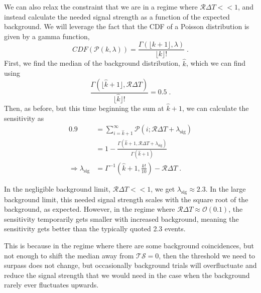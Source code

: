 \documentclass[a4paper,11pt]{article}
\newcommand\ts{\mathcal{TS}}
\begin{document}
We can also relax the constraint that we are in a regime where $\mathcal{R}\Delta T << 1$, and instead calculate the needed signal strength as a function of the expected background. We will leverage the fact that the CDF of a Poisson distribution is given by a gamma function, 
\begin{equation}
    CDF(\mathcal{P}(k,\lambda)) = \frac{\Gamma(\lfloor k+1\rfloor, \lambda)}{\lfloor k\rfloor !} \; .
\end{equation}
First, we find the median of the background distribution, $\hat{k}$, which we can find using
\begin{equation}
    \frac{\Gamma\left(\lfloor\hat{k}+1\rfloor, \mathcal{R}\Delta T\right)}{\lfloor\hat{k}\rfloor !}=0.5 \; .
\end{equation}
Then, as before, but this time beginning the sum at $\hat{k} + 1$, we can calculate the sensitivity as
\begin{align}
\label{eq:analytic}
0.9 &=\sum_{i=\hat{k}+1}^{\infty} \mathcal{P}\left(i ; \mathcal{R}\Delta T+ \lambda_{\mathrm{sig}}\right) \nonumber \\
&=1-\frac{\Gamma\left(\hat{k}+1, \mathcal{R}\Delta T+ \lambda_{\mathrm{sig}}\right)}{\Gamma(\hat{k}+1)} \nonumber \\ 
\Rightarrow \lambda_{\mathrm{sig}} &= \Gamma^{-1}(\hat{k} + 1, \frac{k!}{10}) - \mathcal{R}\Delta T \; .
\end{align}

In the negligible background limit, $\mathcal{R}\Delta T << 1$, we get $\lambda_{\mathrm{sig}} \approx 2.3$. In the large background limit, this needed signal strength scales with the square root of the background, as expected. However, in the regime where $\mathcal{R}\Delta T \approx \mathcal{O}(0.1)$, the sensitivity temporarily gets smaller with increased background, meaning the sensitivity gets better than the typically quoted 2.3 events.

This is because in the regime where there are some background coincidences, but not enough to shift the median away from $\ts = 0$, then the threshold we need to surpass does not change, but occasionally background trials will overfluctuate and reduce the signal strength that we would need in the case when the background rarely ever fluctuates upwards. 
\end{document}
